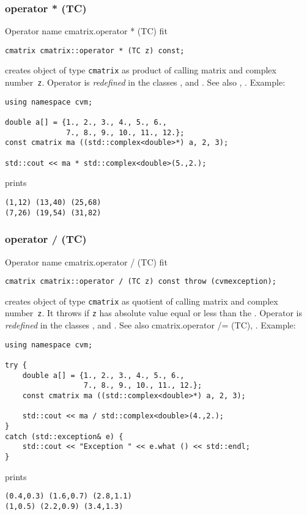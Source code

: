 \subsubsection{operator * (TC)}
Operator%
\pdfdest name {cmatrix.operator * (TC)} fit
\begin{verbatim}
cmatrix cmatrix::operator * (TC z) const;
\end{verbatim}
creates  object of type \verb"cmatrix" as  product of
 calling matrix and  complex number~\verb"z".
Operator is \emph{redefined} in the classes
,  
and .
See also ,
.
Example:
\begin{Verbatim}
using namespace cvm;

double a[] = {1., 2., 3., 4., 5., 6.,
              7., 8., 9., 10., 11., 12.};
const cmatrix ma ((std::complex<double>*) a, 2, 3);

std::cout << ma * std::complex<double>(5.,2.);
\end{Verbatim}
prints
\begin{Verbatim}
(1,12) (13,40) (25,68)
(7,26) (19,54) (31,82)
\end{Verbatim}
\newpage



\subsubsection{operator / (TC)}
Operator%
\pdfdest name {cmatrix.operator / (TC)} fit
\begin{verbatim}
cmatrix cmatrix::operator / (TC z) const throw (cvmexception);
\end{verbatim}
creates  object of type \verb"cmatrix" as  quotient of
 calling matrix and  complex number~\verb"z". 
It throws
if \verb"z" has  absolute value equal or less than the
.
Operator is \emph{redefined} in the classes
,  
and .
See also 
{cmatrix.operator /= (TC)},
.
Example:
\begin{Verbatim}
using namespace cvm;

try {
    double a[] = {1., 2., 3., 4., 5., 6.,
                  7., 8., 9., 10., 11., 12.};
    const cmatrix ma ((std::complex<double>*) a, 2, 3);

    std::cout << ma / std::complex<double>(4.,2.);
}
catch (std::exception& e) {
    std::cout << "Exception " << e.what () << std::endl;
}
\end{Verbatim}
prints
\begin{Verbatim}
(0.4,0.3) (1.6,0.7) (2.8,1.1)
(1,0.5) (2.2,0.9) (3.4,1.3)
\end{Verbatim}
\newpage



